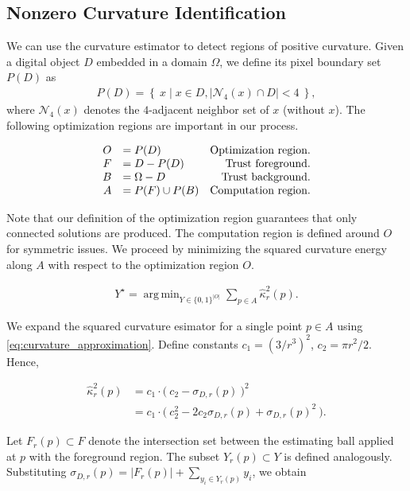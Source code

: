 \documentclass[runningheads]{llncs}
\DeclareMathOperator*{\argmin}{arg\,min}
\begin{document}
\subsection{Nonzero Curvature Identification}

We can use the curvature estimator to detect regions of positive curvature. Given a digital object $D$ embedded in a domain $\Omega$, we define its pixel boundary set $P(D)$ as
\begin{align*}
	P(D) = \left\{ \: x \; | \; x \in D, |\mathcal{N}_4(x) \cap D|<4 \: \right\},
\end{align*}
where $\mathcal{N}_4(x)$ denotes the $4$-adjacent neighbor set of $x$ (without $x$). The following optimization regions are important in our process.

\[\arraycolsep=5pt
\begin{array}{rlr}
	O &= P(D) & \text{Optimization region.} \\
	F &= D - P(D) & \text{Trust foreground.} \\
	B &= \Omega - D & \text{Trust background.} \\
	A &= P(F) \cup P(B) & \text{Computation region}.
\end{array}
\]

Note that our definition of the optimization region guarantees that only connected solutions are produced. The computation region is defined around $O$ for symmetric issues. We proceed by minimizing the squared curvature energy along $A$ with respect to the optimization region $O$. 

\begin{align}			
	Y^{\star} = \argmin_{Y \in \{0,1\}^{|O|}} \sum_{p \in A}{\hat{\kappa}_{r}^2(p)}.
	\label{eq:curvature_highlighting_opt_problem}
\end{align}

We expand the squared curvature esimator for a single point $p \in A$ using \eqref{eq:curvature_approximation}. Define constants $c_1 = (3/r^3)^2$, $c_2=\pi r^2/2$. Hence,

\begin{align*}
\hat{\kappa}_{r}^2(p) &= c_1 \cdot \big(\: c_2 - \sigma_{D,r}(p) \: \big)^2 \\
&= c_1 \cdot \big(\: c_2^2 - 2c_2\sigma_{D,r}(p) + \sigma_{D,r}(p)^2 \: \big).
\end{align*}

Let $F_r(p) \subset F$ denote the intersection set between the estimating ball applied at $p$ with the foreground region. The subset $Y_r(p) \subset Y$ is defined  analogously. Substituting $\sigma_{D,r}(p) = |F_r(p)| + \sum_{y_i \in Y_r(p)}{y_i}$, we obtain
\end{document}

